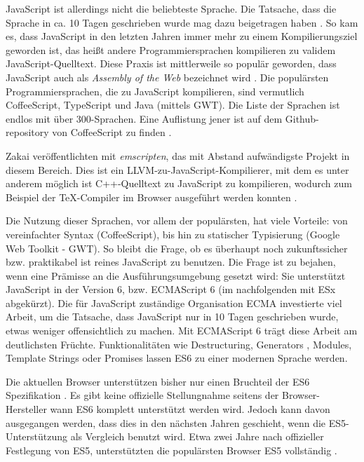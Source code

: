 \documentclass[12pt,twoside]{book}
\begin{document}
JavaScript ist allerdings nicht die beliebteste Sprache. Die Tatsache, dass die Sprache in ca. 10 Tagen geschrieben wurde mag dazu beigetragen haben \citep{severance2012javascript}. So kam es, dass JavaScript in den letzten Jahren immer mehr zu einem Kompilierungsziel geworden ist, das heißt andere Programmiersprachen kompilieren zu validem JavaScript-Quelltext. Diese Praxis ist mittlerweile so populär geworden, dass JavaScript auch als \textit{Assembly of the Web} bezeichnet wird \cite{webassembly}. Die populärsten Programmiersprachen, die zu JavaScript kompilieren, sind vermutlich CoffeeScript, TypeScript und Java (mittels GWT). Die Liste der Sprachen ist endlos mit über 300-Sprachen. Eine Auflistung jener ist auf dem Github-repository von CoffeeScript zu finden \cite{javascriptcompile}.

Zakai \citep{zakai2011emscripten} veröffentlichten mit \textit{emscripten}, das mit Abstand aufwändigste Projekt in diesem Bereich. Dies ist ein LLVM-zu-JavaScript-Kompilierer, mit dem es unter anderem möglich ist C++-Quelltext zu JavaScript zu kompilieren, wodurch zum Beispiel der TeX-Compiler im Browser ausgeführt werden konnten \cite{texlive}.

Die Nutzung dieser Sprachen, vor allem der populärsten, hat viele Vorteile: von vereinfachter Syntax (CoffeeScript), bis hin zu statischer Typisierung (Google Web Toolkit - GWT). So bleibt die Frage, ob es überhaupt noch zukunftssicher bzw. praktikabel ist reines JavaScript zu benutzen.
Die Frage ist zu bejahen, wenn eine Prämisse an die Ausführungsumgebung gesetzt wird: Sie unterstützt JavaScript in der Version 6, bzw. ECMAScript 6 (im nachfolgenden mit ESx abgekürzt).
Die für JavaScript zuständige Organisation ECMA investierte viel Arbeit, um die Tatsache, dass JavaScript nur in 10 Tagen geschrieben wurde, etwas weniger offensichtlich zu machen. Mit ECMAScript 6 \cite{es6} trägt diese Arbeit am deutlichsten Früchte. Funktionalitäten wie Destructuring, Generators , Modules, Template Strings oder Promises lassen ES6 zu einer modernen Sprache werden.

Die aktuellen Browser unterstützen bisher nur einen Bruchteil der ES6 Spezifikation \cite{es6features}. Es gibt keine offizielle Stellungnahme seitens der Browser-Hersteller wann ES6 komplett unterstützt werden wird. Jedoch kann davon ausgegangen werden, dass dies in den nächsten Jahren geschieht, wenn die ES5-Unterstützung als Vergleich benutzt wird. Etwa zwei Jahre nach offizieller Festlegung von ES5, unterstützten die populärsten Browser ES5 vollständig \cite{es5adoption}.
\end{document}
